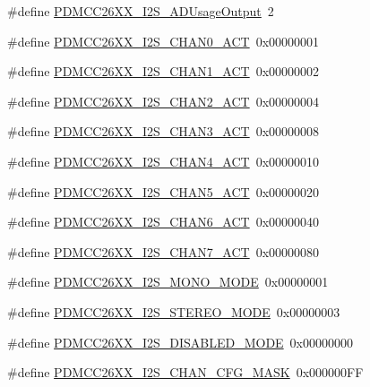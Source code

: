 \begin{DoxyCompactItemize}
\item 
\#define \hyperlink{_p_d_m_c_c26_x_x__util_8h_ad565f18a862a2e3504acb0460735ecfa}{P\+D\+M\+C\+C26\+X\+X\+\_\+\+I2\+S\+\_\+\+A\+D\+Usage\+Output}~2
\item 
\#define \hyperlink{_p_d_m_c_c26_x_x__util_8h_a32d06c7aef6f466e626e9756c85298f8}{P\+D\+M\+C\+C26\+X\+X\+\_\+\+I2\+S\+\_\+\+C\+H\+A\+N0\+\_\+\+A\+C\+T}~0x00000001
\item 
\#define \hyperlink{_p_d_m_c_c26_x_x__util_8h_a51db26f64a63f3907271a1225be723e9}{P\+D\+M\+C\+C26\+X\+X\+\_\+\+I2\+S\+\_\+\+C\+H\+A\+N1\+\_\+\+A\+C\+T}~0x00000002
\item 
\#define \hyperlink{_p_d_m_c_c26_x_x__util_8h_ac3fbe3609b6573ba800ad0b032dfad71}{P\+D\+M\+C\+C26\+X\+X\+\_\+\+I2\+S\+\_\+\+C\+H\+A\+N2\+\_\+\+A\+C\+T}~0x00000004
\item 
\#define \hyperlink{_p_d_m_c_c26_x_x__util_8h_ac974ad9e49dd28cde900652ea15ead1d}{P\+D\+M\+C\+C26\+X\+X\+\_\+\+I2\+S\+\_\+\+C\+H\+A\+N3\+\_\+\+A\+C\+T}~0x00000008
\item 
\#define \hyperlink{_p_d_m_c_c26_x_x__util_8h_a5f6fa4892a90bf5671f11bc6a852102d}{P\+D\+M\+C\+C26\+X\+X\+\_\+\+I2\+S\+\_\+\+C\+H\+A\+N4\+\_\+\+A\+C\+T}~0x00000010
\item 
\#define \hyperlink{_p_d_m_c_c26_x_x__util_8h_aac36e1d05aeb0511fa6477b92f92d5cb}{P\+D\+M\+C\+C26\+X\+X\+\_\+\+I2\+S\+\_\+\+C\+H\+A\+N5\+\_\+\+A\+C\+T}~0x00000020
\item 
\#define \hyperlink{_p_d_m_c_c26_x_x__util_8h_a799a0e38f04c4688298abd5516b910e9}{P\+D\+M\+C\+C26\+X\+X\+\_\+\+I2\+S\+\_\+\+C\+H\+A\+N6\+\_\+\+A\+C\+T}~0x00000040
\item 
\#define \hyperlink{_p_d_m_c_c26_x_x__util_8h_ab1bc745d8d55898e5c8074f53cb5e4ab}{P\+D\+M\+C\+C26\+X\+X\+\_\+\+I2\+S\+\_\+\+C\+H\+A\+N7\+\_\+\+A\+C\+T}~0x00000080
\item 
\#define \hyperlink{_p_d_m_c_c26_x_x__util_8h_a26ad06f03e00557ec6969cb628e308f1}{P\+D\+M\+C\+C26\+X\+X\+\_\+\+I2\+S\+\_\+\+M\+O\+N\+O\+\_\+\+M\+O\+D\+E}~0x00000001
\item 
\#define \hyperlink{_p_d_m_c_c26_x_x__util_8h_aab44412c8919fe1577a4a0bc428aa90c}{P\+D\+M\+C\+C26\+X\+X\+\_\+\+I2\+S\+\_\+\+S\+T\+E\+R\+E\+O\+\_\+\+M\+O\+D\+E}~0x00000003
\item 
\#define \hyperlink{_p_d_m_c_c26_x_x__util_8h_a1d104f1b2b70f3a0574862e0ee8475fc}{P\+D\+M\+C\+C26\+X\+X\+\_\+\+I2\+S\+\_\+\+D\+I\+S\+A\+B\+L\+E\+D\+\_\+\+M\+O\+D\+E}~0x00000000
\item 
\#define \hyperlink{_p_d_m_c_c26_x_x__util_8h_afffc8012d078494895133861764690fe}{P\+D\+M\+C\+C26\+X\+X\+\_\+\+I2\+S\+\_\+\+C\+H\+A\+N\+\_\+\+C\+F\+G\+\_\+\+M\+A\+S\+K}~0x000000\+F\+F

\end{DoxyCompactItemize}
